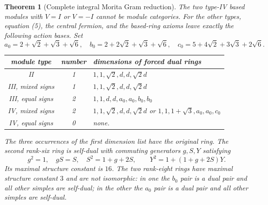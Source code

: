 \documentclass[11pt]{article}
\newtheorem{theorem}{Theorem}\newtheorem{lemma}{Lemma}\newtheorem{corollary}{Corollary}
\begin{document}
\begin{theorem}[Complete integral Morita Gram reduction]
The two type-IV based modules with $V=I$ or $V=-I$ cannot be module
categories. For the other types, equation (5), the central fermion,
and the based-ring axioms leave exactly the following action bases.
Set
\[
a_0=2+\sqrt2+\sqrt3+\sqrt6,\quad
b_0=2+2\sqrt2+\sqrt3+\sqrt6,\quad
c_0=5+4\sqrt2+3\sqrt3+2\sqrt6.
\]
\begin{center}\begin{tabular}{c|c|l}
module type&number&dimensions of forced dual rings\\\hline
II&1&$1,1,\sqrt2,d,d,\sqrt2d$\\
III, mixed signs&1&$1,1,\sqrt2,d,d,\sqrt2d$\\
III, equal signs&2&$1,1,d,d,a_0,a_0,b_0,b_0$\\
IV, mixed signs&2&$1,1,\sqrt2,d,d,\sqrt2d$ or $1,1,1+\sqrt3,a_0,a_0,c_0$\\
IV, equal signs&0&none.
\end{tabular}\end{center}
The three occurrences of the first dimension list have the original
ring. The second rank-six ring is self-dual with commuting generators
$g,S,Y$ satisfying
\[
g^2=1,\quad gS=S,\quad S^2=1+g+2S,\qquad
Y^2=1+(1+g+2S)Y.
\]
Its maximal structure constant is $16$.
The two rank-eight rings have maximal structure constant $3$ and are
not isomorphic: in one the $b_0$ pair is a dual pair and all other simples
are self-dual; in the other the $a_0$ pair is a dual pair and all other
simples are self-dual.
\end{theorem}
\end{document}

